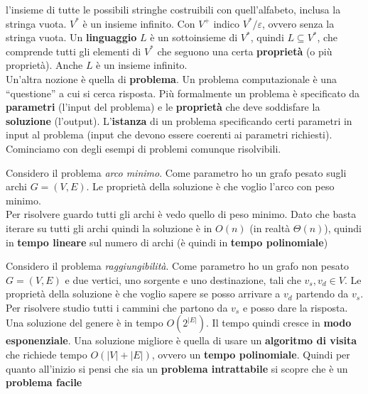 \documentclass[a4paper,12pt, oneside]{book}
\begin{document}
l'insieme di tutte le possibili stringhe costruibili con quell'alfabeto, inclusa
la stringa vuota. $V^*$ è un insieme infinito. Con $V^+$ indico
$V^*/\varepsilon$, ovvero senza la stringa vuota. Un \textbf{linguaggio} $L$ è
un sottoinsieme di $V^*$, quindi $L\subseteq V^*$, che comprende tutti gli
elementi di $V^*$ che seguono una certa \textbf{proprietà} (o più
proprietà). Anche $L$ è un insieme infinito.\\
Un'altra nozione è quella di \textbf{problema}. Un problema computazionale è una
``questione'' a cui si cerca risposta. Più formalmente un problema è specificato
da \textbf{parametri} (l'input del problema) e le \textbf{proprietà} che deve
soddisfare la \textbf{soluzione} (l'output). L'\textbf{istanza} di un problema
specificando certi parametri in input al problema (input che devono essere
coerenti ai parametri richiesti).\\
Cominciamo con degli esempi di problemi comunque risolvibili.
\begin{esempio}
  Considero il problema \emph{arco minimo}. Come parametro ho un grafo pesato
  sugli archi $G=(V,E)$. Le proprietà della soluzione è che voglio l'arco con
  peso minimo.\\
  Per risolvere guardo tutti gli archi è vedo quello di peso minimo. Dato che
  basta iterare su tutti gli archi quindi la soluzione è in $O(n)$ (in realtà
  $\Theta(n)$), quindi in \textbf{tempo lineare} sul numero di archi (è quindi
  in \textbf{tempo polinomiale})
\end{esempio}
\begin{esempio}
  Considero il problema \emph{raggiungibilità}. Come parametro ho un grafo non
  pesato $G=(V,E)$ e due vertici, uno sorgente e uno destinazione, tali che
  $v_s,v_d\in V$. Le proprietà della soluzione è che voglio sapere se posso
  arrivare a $v_d$ partendo da $v_s$.\\
  Per risolvere studio tutti i cammini che partono da $v_s$ e posso dare la
  risposta. Una soluzione del genere è in tempo $O(2^{|E|})$. Il tempo quindi
  cresce in \textbf{modo esponenziale}. Una soluzione migliore è quella di usare
  un \textbf{algoritmo di visita} che richiede tempo $O(|V|+|E|)$, ovvero un
  \textbf{tempo polinomiale}. Quindi per quanto all'inizio si pensi
  che sia un \textbf{problema intrattabile} si scopre che è un \textbf{problema
    facile} 
\end{esempio}
\end{document}

